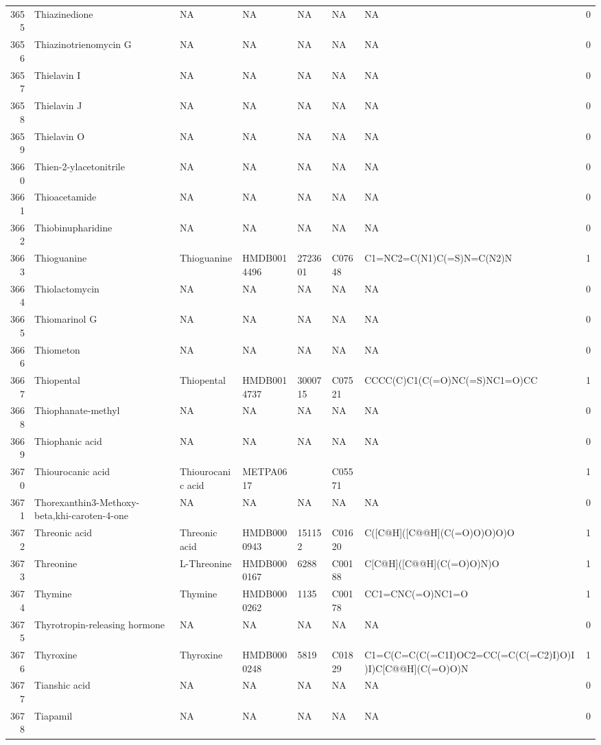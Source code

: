 \documentclass[a4paper]{article}
\begin{document}
\begin{longtable}{rlllllll}
  3655 & Thiazinedione & NA & NA & NA & NA & NA & 0 \\ 
  3656 & Thiazinotrienomycin G & NA & NA & NA & NA & NA & 0 \\ 
  3657 & Thielavin I & NA & NA & NA & NA & NA & 0 \\ 
  3658 & Thielavin J & NA & NA & NA & NA & NA & 0 \\ 
  3659 & Thielavin O & NA & NA & NA & NA & NA & 0 \\ 
  3660 & Thien-2-ylacetonitrile & NA & NA & NA & NA & NA & 0 \\ 
  3661 & Thioacetamide & NA & NA & NA & NA & NA & 0 \\ 
  3662 & Thiobinupharidine & NA & NA & NA & NA & NA & 0 \\ 
  3663 & Thioguanine & Thioguanine & HMDB0014496 & 2723601 & C07648 & C1=NC2=C(N1)C(=S)N=C(N2)N & 1 \\ 
  3664 & Thiolactomycin & NA & NA & NA & NA & NA & 0 \\ 
  3665 & Thiomarinol G & NA & NA & NA & NA & NA & 0 \\ 
  3666 & Thiometon & NA & NA & NA & NA & NA & 0 \\ 
  3667 & Thiopental & Thiopental & HMDB0014737 & 3000715 & C07521 & CCCC(C)C1(C(=O)NC(=S)NC1=O)CC & 1 \\ 
  3668 & Thiophanate-methyl & NA & NA & NA & NA & NA & 0 \\ 
  3669 & Thiophanic acid & NA & NA & NA & NA & NA & 0 \\ 
  3670 & Thiourocanic acid & Thiourocanic acid & METPA0617 &  & C05571 &  & 1 \\ 
  3671 & Thorexanthin3-Methoxy-beta,khi-caroten-4-one & NA & NA & NA & NA & NA & 0 \\ 
  3672 & Threonic acid & Threonic acid & HMDB0000943 & 151152 & C01620 & C([C@H]([C@@H](C(=O)O)O)O)O & 1 \\ 
  3673 & Threonine & L-Threonine & HMDB0000167 & 6288 & C00188 & C[C@H]([C@@H](C(=O)O)N)O & 1 \\ 
  3674 & Thymine & Thymine & HMDB0000262 & 1135 & C00178 & CC1=CNC(=O)NC1=O & 1 \\ 
  3675 & Thyrotropin-releasing hormone & NA & NA & NA & NA & NA & 0 \\ 
  3676 & Thyroxine & Thyroxine & HMDB0000248 & 5819 & C01829 & C1=C(C=C(C(=C1I)OC2=CC(=C(C(=C2)I)O)I)I)C[C@@H](C(=O)O)N & 1 \\ 
  3677 & Tianshic acid & NA & NA & NA & NA & NA & 0 \\ 
  3678 & Tiapamil & NA & NA & NA & NA & NA & 0 \\ 

\end{longtable}
\end{document}
